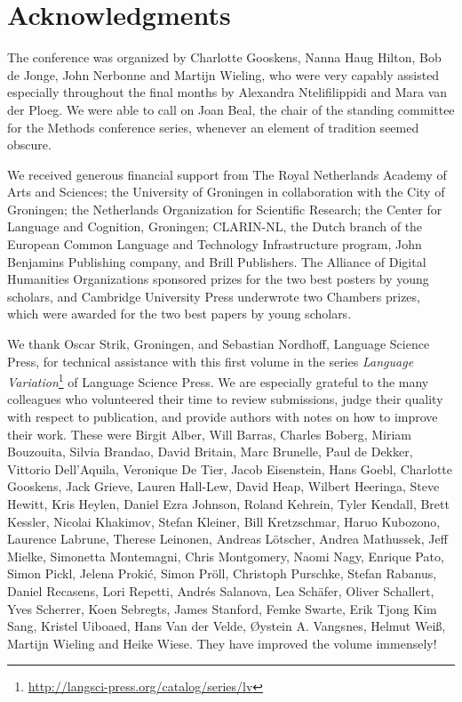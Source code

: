\documentclass[output=paper]{LSP/langsci}
\begin{document}
\section*{Acknowledgments}

The conference was organized by Charlotte Gooskens, Nanna Haug Hilton, Bob de Jonge, John Nerbonne and Martijn Wieling, who were very capably assisted especially throughout the final months by Alexandra Ntelifilippidi and Mara van der Ploeg. We were able to call on Joan Beal, the chair of the standing committee for the Methods conference series, whenever an element of tradition seemed obscure.

We received generous financial support from The Royal Netherlands Academy of Arts and Sciences; the University of Groningen in collaboration with the City of Groningen; the Netherlands Organization for Scientific Research; the Center for Language and Cognition, Groningen; CLARIN-NL, the Dutch branch of the European Common Language and Technology Infrastructure program, John Benjamins Publishing company, and Brill Publishers. The Alliance of Digital Humanities Organizations sponsored prizes for the two best posters by young scholars, and Cambridge University Press underwrote two Chambers prizes, which were awarded for the two best papers by young scholars. 

We thank Oscar Strik, Groningen, and Sebastian Nordhoff, Language Science Press, for technical assistance with this first volume in the series \textit{Language Variation}\footnote{\url{http://langsci-press.org/catalog/series/lv}} of Language Science Press. We are especially grateful to the many colleagues who volunteered their time to review submissions, judge their quality with respect to publication, and provide authors with notes on how to improve their work. These were Birgit Alber, Will Barras, Charles Boberg, Miriam Bouzouita, Silvia Brandao, David Britain, Marc Brunelle, Paul de Dekker, Vittorio Dell'Aquila, Veronique De Tier, Jacob Eisenstein, Hans Goebl, Charlotte Gooskens, Jack Grieve, Lauren Hall-Lew, David Heap, Wilbert Heeringa, Steve Hewitt, Kris Heylen, Daniel Ezra Johnson, Roland Kehrein, Tyler Kendall, Brett Kessler, Nicolai Khakimov, Stefan Kleiner, Bill Kretzschmar, Haruo Kubozono, Laurence Labrune, Therese Leinonen, Andreas Lötscher, Andrea Mathussek, Jeff Mielke, Simonetta Montemagni, Chris Montgomery, Naomi Nagy, Enrique Pato, Simon Pickl, Jelena Prokić, Simon Pröll, Christoph Purschke, Stefan Rabanus, Daniel Recasens, Lori Repetti, Andrés Salanova, Lea Schäfer, Oliver Schallert, Yves Scherrer, Koen Sebregts, James Stanford, Femke Swarte, Erik Tjong Kim Sang, Kristel Uiboaed, Hans Van der Velde, Øystein A. Vangsnes, Helmut Weiß, Martijn Wieling and Heike Wiese. They have improved the volume immensely!


\printbibliography[heading=subbibliography,notkeyword=this]
\end{document}
